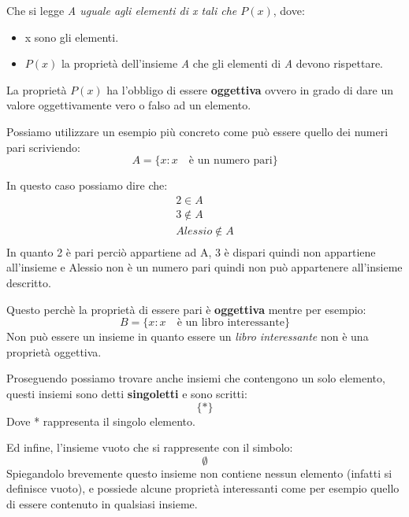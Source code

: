\documentclass{article}
\begin{document}
Che si legge \textit{A uguale agli elementi di x tali che $P(x)$}, dove:
\begin{itemize}
        \item x sono gli elementi.
        \item $P(x)$ la proprietà dell'insieme \textit{A} che gli elementi di \textit{A} devono rispettare.
\end{itemize}
La proprietà $P(x)$ ha l'obbligo di essere \textbf{oggettiva} ovvero in grado di dare un valore oggettivamente vero o falso ad un elemento. \par
Possiamo utilizzare un esempio più concreto come può essere quello dei numeri pari scriviendo:
\begin{equation}
        A = \{x : x \quad \textrm{è un numero pari} \} 
\end{equation}

In questo caso possiamo dire che:
\begin{align*}
        2 \in A \\
        3 \not \in A \\
        Alessio \not \in A \\ 
\end{align*}
In quanto 2 è pari perciò appartiene ad A, 3 è dispari quindi non appartiene all'insieme e Alessio non è un numero pari quindi non può appartenere all'insieme descritto.

Questo perchè la proprietà di essere pari è \textbf{oggettiva} mentre per esempio:
\begin{equation}
        B = \{x : x \quad \textrm{è un libro interessante} \} 
\end{equation}
Non può essere un insieme in quanto essere un \textit{libro interessante} non è una proprietà oggettiva.

Proseguendo possiamo trovare anche insiemi che contengono un solo elemento, questi insiemi sono detti \textbf{singoletti} e sono scritti:
\begin{equation}
        \{*\}
\end{equation}
Dove * rappresenta il singolo elemento.

Ed infine, l'insieme vuoto che si rappresente con il simbolo:
\begin{equation}
        \emptyset 
\end{equation}
Spiegandolo brevemente questo insieme non contiene nessun elemento (infatti si definisce vuoto), e possiede alcune proprietà interessanti come per esempio quello di essere contenuto in qualsiasi insieme.
\end{document}
